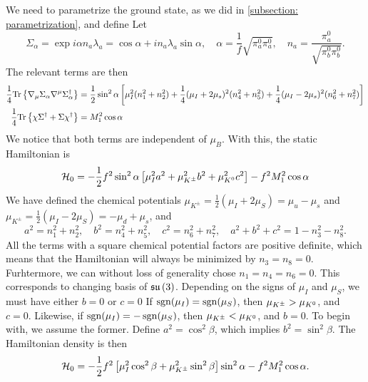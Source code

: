 We need to parametrize the ground state, as we did in \autoref{subsection: parametrization}, and define
Let
%
\begin{equation}
    \Sigma_\alpha 
    = \exp{i \alpha n_a \lambda_a} = \cos \alpha + i n_a \lambda_a \sin \alpha,
    \quad \alpha = \frac{1}{f} \sqrt{\pi_a^0 \pi_a^0}, \quad n_a = \frac{\pi_a^0}{\sqrt{\pi_b^0 \pi_b^0}}. 
\end{equation}
%
The relevant terms are then
%
\begin{align}
    \frac{1}{4} \text{Tr} \left\{ \nabla_\mu \Sigma_\alpha \nabla^\mu \Sigma_\alpha^\dagger \right\}
    & = \frac{1}{2} \sin^2\alpha
    \left[
        \mu_I^2 (n_1^2 + n_2^2) 
        + \frac{1}{4} (\mu_I + 2\mu_s)^2(n_4^2 + n_5^2)
        + \frac{1}{4} (\mu_I - 2\mu_s)^2(n_6^2 + n_7^2)
    \right]\\
    \frac{1}{4} \text{Tr} \left\{ \chi \Sigma^\dagger + \Sigma \chi^\dagger \right\} 
    & = M_1^2 \cos \alpha
\end{align}
%
We notice that both terms are independent of $\mu_B$.
With this, the static Hamiltonian is
%
\begin{align}
    \mathcal{H}_0
    = -\frac{1}{2}f^2\sin^2\alpha
    \left[
        \mu_I^2a^2 + \mu_{K^\pm}^2 b^2  + \mu_{K^0}^2 c^2
    \right]
    - f^2M_1^2 \cos\alpha
\end{align}
%
We have defined the chemical potentials $\mu_{K^{\pm}} = \frac{1}{2}(\mu_I + 2 \mu_S) = \mu_u - \mu_s$ and $\mu_{K^{\pm}} = \frac{1}{2}(\mu_I - 2 \mu_S) = -\mu_d + \mu_s$, 
and
%
\begin{equation}
    a^2 = n_1^2 + n_2^2, \quad
    b^2 = n_4^2 + n_5^2, \quad
    c^2 = n_6^2 + n_7^2, \quad
    a^2 + b^2 + c^2 = 1 - n_3^2 - n_8^2.
\end{equation}
%
All the terms with a square chemical potential factors are positive definite, which means that the Hamiltonian will always be minimized by $n_3 = n_8 = 0$.
Furhtermore, we can without loss of generality chose $n_1 = n_4 = n_6 = 0$.
This corresponds to changing basis of $\mathfrak{su}\left(3\right)$.
Depending on the signs of $\mu_I$ and $\mu_S$, we must have either $b = 0$ or $c = 0$
If $\operatorname{sgn}(\mu_I) = \operatorname{sgn}(\mu_S)$, then $\mu_{K^\pm} > \mu_{K^0}$, and $c = 0$.
Likewise, if $\operatorname{sgn}(\mu_I) = - \operatorname{sgn}(\mu_S)$, then $\mu_{K^\pm} < \mu_{K^0}$, and $b = 0$.
To begin with, we assume the former.
Define $a^2 = \cos^2\beta$, which implies $b^2 = \sin^2\beta$.
The Hamiltonian density is then
%
\begin{equation}
    \mathcal{H}_0 =
    -\frac{1}{2} f^2
    \left[
        \mu_I^2 \cos^2\beta + \mu_{K^\pm}^2\sin^2\beta
    \right]
    \sin^2\alpha
    -
    f^2 M_1^2 \cos\alpha.
\end{equation}



